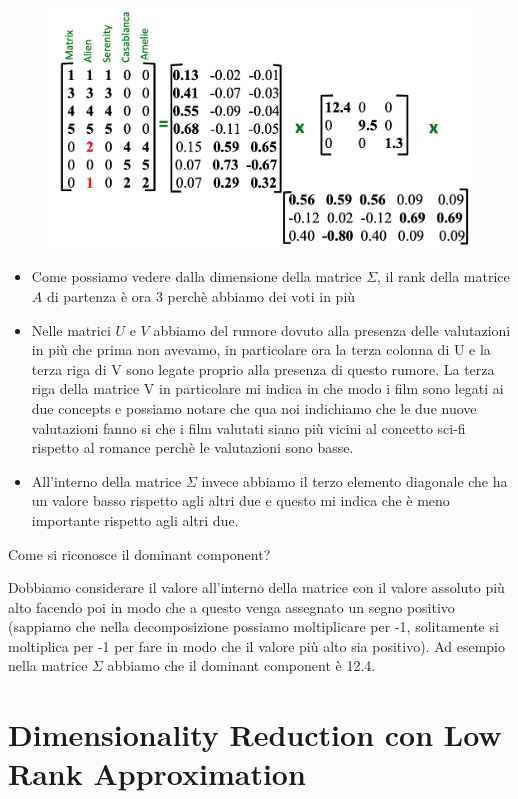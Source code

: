 \documentclass[14pt]{extreport}
\begin{document}
\begin{figure}[H]
	\centering
	\includegraphics[width=0.7\linewidth]{499.jpeg}
\end{figure}

\begin{itemize}
	\item Come possiamo vedere dalla dimensione della matrice $\Sigma$, il rank della matrice $A$ di partenza è ora 3 perchè abbiamo dei voti in più
	\item Nelle matrici $U$ e $V$ abbiamo del rumore dovuto alla presenza delle valutazioni in più che prima non avevamo, in particolare ora la terza
	      colonna di U e la terza riga di V sono legate proprio alla presenza di questo rumore. La terza riga della matrice V in particolare mi indica
	      in che modo i film sono legati ai due concepts e possiamo notare che qua noi indichiamo che le due nuove valutazioni fanno si che i film
	      valutati siano più vicini al concetto sci-fi rispetto al romance perchè le valutazioni sono basse.
	\item All'interno della matrice $\Sigma$ invece abbiamo il terzo elemento diagonale che ha un valore basso rispetto agli altri due e questo mi
	indica che è meno importante rispetto agli altri due.
\end{itemize}

Come si riconosce il dominant component?

Dobbiamo considerare il valore all'interno della matrice con il valore assoluto più alto facendo poi in modo che a questo venga assegnato un segno
positivo (sappiamo che nella decomposizione possiamo moltiplicare per -1, solitamente si moltiplica per -1 per fare in modo che il valore più alto sia
positivo). Ad esempio nella matrice $\Sigma$ abbiamo che il dominant component è 12.4.

\section{Dimensionality Reduction con Low Rank Approximation}
\end{document}
